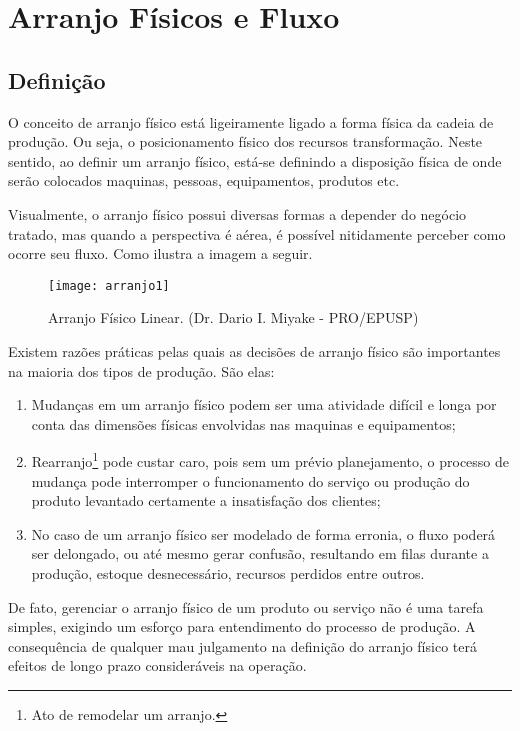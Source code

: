 \chapter[Arranjo Físicos e Fluxo]{Arranjo Físicos e Fluxo}
\label{chap:arranjo}

	\section[Definição]{Definição}
	\label{sec:arranjo_definicao}

		O conceito de arranjo físico está ligeiramente ligado a forma física da cadeia de produção. Ou seja, o posicionamento físico dos recursos transformação. Neste sentido, ao definir um arranjo físico, está-se definindo a disposição física de onde serão colocados maquinas, pessoas, equipamentos, produtos etc.

		Visualmente, o arranjo físico possui diversas formas a depender do negócio tratado, mas quando a perspectiva é aérea, é possível nitidamente perceber como ocorre seu fluxo. Como ilustra a imagem a seguir.

		\begin{figure}[h]
			\centering
			\texttt{[image: arranjo1]}
			\caption[Arranjo Físico Linear]{Arranjo Físico Linear. (Dr. Dario I. Miyake - PRO/EPUSP)}
			\label{fig:arranjo1}
		\end{figure}

		Existem razões práticas pelas quais as decisões de arranjo físico são importantes na maioria dos tipos de produção. São elas:

		\begin{enumerate}
			\item{Mudanças em um arranjo físico podem ser uma atividade difícil e longa por conta das dimensões físicas envolvidas nas maquinas e equipamentos;}
			\item{Rearranjo\footnote{Ato de remodelar um arranjo.} pode custar caro, pois sem um prévio planejamento, o processo de mudança pode interromper o funcionamento do serviço ou produção do produto levantado certamente a insatisfação dos clientes;}
			\item{No caso de um arranjo físico ser modelado de forma erronia, o fluxo poderá ser delongado, ou até mesmo gerar confusão, resultando em filas durante a produção, estoque desnecessário, recursos perdidos entre outros.}
		\end{enumerate}

		De fato, gerenciar o arranjo físico de um produto ou serviço não é uma tarefa simples, exigindo um esforço para entendimento do processo de produção. A consequência de qualquer mau julgamento na definição do arranjo físico terá efeitos de longo prazo consideráveis na operação.

